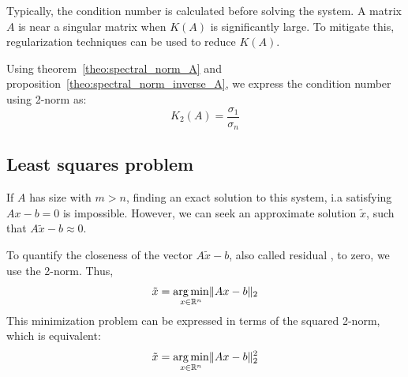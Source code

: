 \documentclass{article}
\begin{document}
Typically, the condition number is calculated before solving the system. A
matrix $A$ is near a singular matrix when $K(A)$ is significantly large. To
mitigate this, regularization techniques can be used to reduce $K(A)$.
\begin{proposition}
    Using theorem~\ref{theo:spectral_norm_A} and
    proposition~\ref{theo:spectral_norm_inverse_A}, we express the condition
    number using 2-norm as: 
    $$K_2(A)=\frac{\sigma_1}{\sigma_n}$$
\end{proposition}
\subsection{Least squares problem}
If $A$ has size with $m>n$, finding an exact solution to this system, i.a
satisfying $Ax-b=0$ is impossible. However, we can seek an approximate
solution $\tilde{x}$, such that $A\tilde{x}-b\approx0$.

To quantify the closeness of the vector $A\tilde{x}-b$, also called residual
, to zero, we use the 2-norm. Thus,
$$\tilde{x}=\operatorname*{arg\,min}_{x\in \mathbb{R}^n}\lVert Ax-b\rVert_2$$
This minimization problem can be expressed in terms of the squared 2-norm,
which is equivalent:
$$\tilde{x}=\operatorname*{arg\,min}_{x\in \mathbb{R}^n}\lVert Ax-b\rVert_2^2$$
\end{document}
